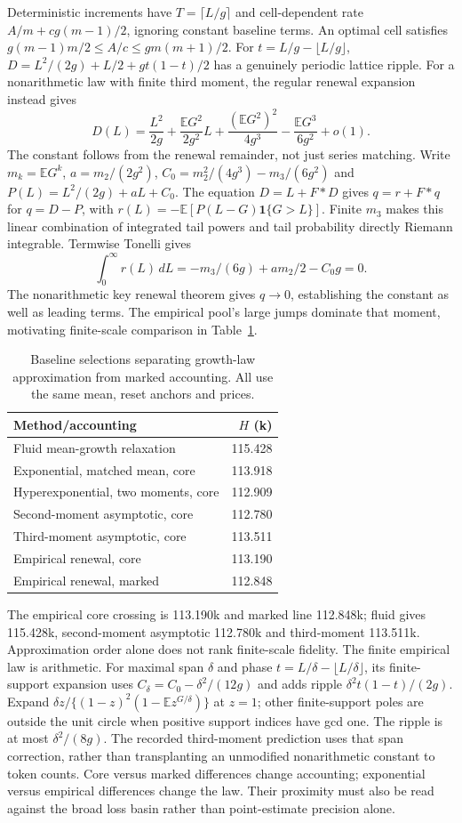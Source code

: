 \documentclass[sigconf,screen,nonacm]{acmart}
\makeatletter
\newcommand{\E}{\mathbb{E}}
\newcommand{\ind}{\mathbf{1}}
\newcommand{\PaperRenewalMethods}{%
\begin{tabular}{@{}lr@{}}\toprule
Method/accounting & $H$ (k)\\\midrule
Fluid mean-growth relaxation & 115.428\\
Exponential, matched mean, core & 113.918\\
Hyperexponential, two moments, core & 112.909\\
Second-moment asymptotic, core & 112.780\\
Third-moment asymptotic, core & 113.511\\
Empirical renewal, core & 113.190\\
Empirical renewal, marked & 112.848\\\bottomrule
\end{tabular}}
\makeatother
\begin{document}
Deterministic increments have $T=\lceil L/g\rceil$ and cell-dependent
rate $A/m+cg(m-1)/2$, ignoring constant baseline terms. An optimal cell
satisfies $g(m-1)m/2\le A/c\le gm(m+1)/2$.
For $t=L/g-\lfloor L/g\rfloor$,
$D=L^2/(2g)+L/2+gt(1-t)/2$ has a genuinely periodic lattice ripple.
For a nonarithmetic law with finite third moment, the regular renewal
expansion instead gives
\begin{equation}
D(L)=\frac{L^2}{2g}+\frac{\E G^2}{2g^2}L
+\frac{(\E G^2)^2}{4g^3}-\frac{\E G^3}{6g^2}+o(1).
\end{equation}
The constant follows from the renewal remainder, not just series matching.
Write $m_k=\E G^k$, $a=m_2/(2g^2)$,
$C_0=m_2^2/(4g^3)-m_3/(6g^2)$ and $P(L)=L^2/(2g)+aL+C_0$.
The equation $D=L+F*D$ gives $q=r+F*q$ for $q=D-P$, with
$r(L)=-\E[P(L-G)\ind\{G>L\}]$.
Finite $m_3$ makes this linear combination of integrated tail powers
and tail probability directly Riemann integrable. Termwise Tonelli gives
\begin{equation}
\int_0^\infty r(L)\,dL=-m_3/(6g)+am_2/2-C_0g=0.
\end{equation}
The nonarithmetic key renewal theorem gives $q\to0$, establishing the
constant as well as leading terms. The empirical pool's large jumps dominate
that moment, motivating finite-scale comparison in Table~\ref{tab:renewal-methods}.

\begin{table}[ht]
\centering\footnotesize\setlength{\tabcolsep}{3pt}
\caption{Baseline selections separating growth-law approximation from
marked accounting. All use the same mean, reset anchors and prices.}
\label{tab:renewal-methods}\PaperRenewalMethods
\end{table}

The empirical core crossing is 113.190k and marked line 112.848k;
fluid gives 115.428k, second-moment asymptotic 112.780k and third-moment
113.511k. Approximation order alone does not rank finite-scale fidelity.
The finite empirical law is arithmetic. For maximal span $\delta$
and phase $t=L/\delta-\lfloor L/\delta\rfloor$, its finite-support
expansion uses $C_\delta=C_0-\delta^2/(12g)$ and adds ripple
$\delta^2t(1-t)/(2g)$. Expand
$\delta z/\{(1-z)^2(1-\E z^{G/\delta})\}$ at $z=1$;
other finite-support poles are outside the unit circle when positive
support indices have gcd one. The ripple is at most $\delta^2/(8g)$.
The recorded third-moment prediction uses that span correction, rather
than transplanting an unmodified nonarithmetic constant to token counts.
Core versus marked differences change accounting; exponential versus
empirical differences change the law. Their proximity must also be read
against the broad loss basin rather than point-estimate precision alone.
\end{document}
